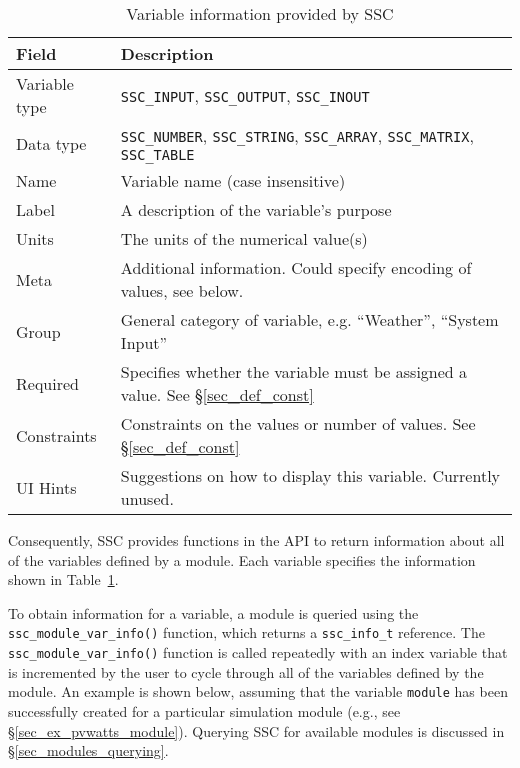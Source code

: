 \documentclass{article}
\begin{document}
\begin{table}[ht]
\begin{center}
\begin{tabular}{ll}
Field & Description\\
\hline
Variable type & \texttt{SSC\_INPUT}, \texttt{SSC\_OUTPUT}, \texttt{SSC\_INOUT} \\
Data type & \texttt{SSC\_NUMBER}, \texttt{SSC\_STRING}, \texttt{SSC\_ARRAY}, \texttt{SSC\_MATRIX}, \texttt{SSC\_TABLE} \\
Name & Variable name (case insensitive) \\
Label & A description of the variable's purpose \\
Units & The units of the numerical value(s) \\
Meta & Additional information. Could specify encoding of values, see below. \\
Group & General category of variable, e.g. ``Weather'', ``System Input'' \\
Required & Specifies whether the variable must be assigned a value. See \S\ref{sec_def_const} \\
Constraints & Constraints on the values or number of values. See \S\ref{sec_def_const} \\
UI Hints & Suggestions on how to display this variable.  Currently unused. \\
\end{tabular}
\caption{Variable information provided by SSC}
\label{tab_varinfo}
\end{center}
\end{table}

Consequently, SSC provides functions in the API to return information about all of the variables defined by a module.  Each variable specifies the information shown in Table~\ref{tab_varinfo}.

To obtain information for a variable, a module is queried using the \texttt{ssc\_module\_var\_info()} function, which returns a \texttt{ssc\_info\_t} reference.  The \texttt{ssc\_module\_var\_info()} function is called repeatedly with an index variable that is incremented by the user to cycle through all of the variables defined by the module.  An example is shown below, assuming that the variable \texttt{module} has been successfully created for a particular simulation module (e.g., see \S\ref{sec_ex_pvwatts_module}).  Querying SSC for available modules is discussed in \S\ref{sec_modules_querying}.
\end{document}
